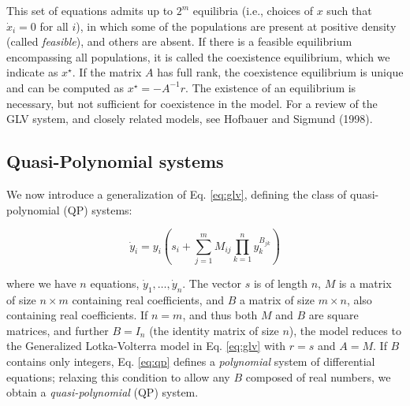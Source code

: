 \documentclass{article}
\begin{document}
This set of equations admits up to \(2^m\) equilibria (i.e., choices of
\(x\) such that \(\dot{x}_i = 0\) for all \(i\)), in which some of the
populations are present at positive density (called \emph{feasible}),
and others are absent. If there is a feasible equilibrium encompassing
all populations, it is called the coexistence equilibrium, which we
indicate as \(x^\star\). If the matrix \(A\) has full rank, the
coexistence equilibrium is unique and can be computed as
\(x^\star = -A^{-1}r\). The existence of an equilibrium is necessary,
but not sufficient for coexistence in the model. For a review of the GLV
system, and closely related models, see Hofbauer and Sigmund (1998).

\hypertarget{quasi-polynomial-systems}{%
\subsection{Quasi-Polynomial systems}\label{quasi-polynomial-systems}}

\label{sec:qp}

We now introduce a generalization of Eq. \ref{eq:glv}, defining the
class of quasi-polynomial (QP) systems:

\begin{equation}
\label{eq:qp}
\dot{y}_i = y_i \left( s_i + \sum_{j = 1}^m M_{ij} \prod_{k = 1}^n y_k^{B_{jk}} \right)
\end{equation}

where we have \(n\) equations, \(\dot{y}_1, \ldots, \dot{y}_n\). The
vector \(s\) is of length \(n\), \(M\) is a matrix of size
\(n \times m\) containing real coefficients, and \(B\) a matrix of size
\(m \times n\), also containing real coefficients. If \(n = m\), and
thus both \(M\) and \(B\) are square matrices, and further \(B=I_n\)
(the identity matrix of size \(n\)), the model reduces to the
Generalized Lotka-Volterra model in Eq. \ref{eq:glv} with \(r = s\) and
\(A = M\). If \(B\) contains only integers, Eq. \ref{eq:qp} defines a
\emph{polynomial} system of differential equations; relaxing this
condition to allow any \(B\) composed of real numbers, we obtain a
\emph{quasi-polynomial} (QP) system.
\end{document}
